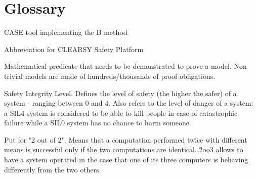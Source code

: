 \chapter*{Glossary}


\begin{vocabulary}[Atelier B]
CASE tool implementing the B method
\end{vocabulary}

\begin{vocabulary}[CSSP]
Abbreviation for CLEARSY Safety Platform
\end{vocabulary}

\begin{vocabulary}
Mathematical predicate that needs to be demonstrated to prove a model. Non trivial models are made of hundreds/thousands of proof obligations.
\end{vocabulary}

\begin{vocabulary}[SIL\{3/4\}]
Safety Integrity Level. Defines the level of safety (the higher the safer) of a system - ranging between 0 and 4. Also refers to the level of danger of a system: a SIL4 system is considered to be able to kill people in case of catastrophic failure while a SIL0 system has no chance to harm someone.
\end{vocabulary}

\begin{vocabulary}[2oo2]
Put for "2 out of 2". Means that a computation performed twice with different means is successful only if the two computations are identical. 2oo3 allows to have a system operated in the case that one of its three computers is behaving differently from the two others.
\end{vocabulary}
